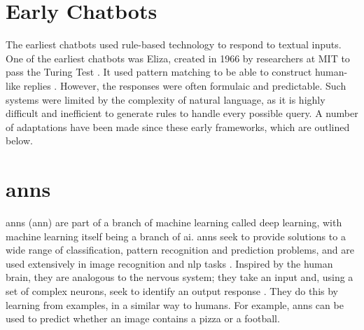



\section{Early Chatbots}
\label{sec:background_early_chatbots}
The earliest chatbots used rule-based technology to respond to textual inputs. One of the earliest chatbots was Eliza, created in 1966 by researchers at MIT to pass the Turing Test \citep{zemvcik2019}. It used pattern matching to be able to construct human-like replies \citep{Luka}. However, the responses were often formulaic and predictable. Such systems were limited by the complexity of natural language, as it is highly difficult and inefficient to generate rules to handle every possible query. A number of adaptations have been made since these early frameworks, which are outlined below.


\section{\acrlong{ann}s}
\label{sec:background_anns}

\acrlong{ann}s (\acrshort{ann}) are part of a branch of machine learning called deep learning, with machine learning itself being a branch of \acrlong{ai}. \acrshort{ann}s seek to provide solutions to a wide range of classification, pattern recognition and prediction problems, and are used extensively in image recognition and \acrfull{nlp} tasks \citep{Abiodun}. Inspired by the human brain, they are analogous to the nervous system; they take an input and, using a set of complex neurons, seek to identify an output response \citep{Bishop}. They do this by learning from examples, in a similar way to humans. For example, \acrshort{ann}s can be used to predict whether an image contains a pizza or a football.

